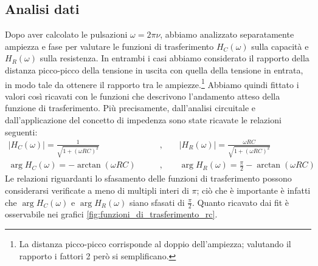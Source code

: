\documentclass[a4paper]{article}
\begin{document}
\subsection{Analisi dati}
Dopo aver calcolato le pulsazioni $\omega = 2\pi \nu$, abbiamo analizzato separatamente ampiezza e fase per valutare le funzioni di trasferimento $H_C(\omega)$ sulla capacità e $H_R(\omega)$ sulla resistenza. In entrambi i casi abbiamo considerato il rapporto della distanza picco-picco della tensione in uscita con quella della tensione in entrata, in modo tale da ottenere il rapporto tra le ampiezze.\footnote{La distanza picco-picco corrisponde al doppio dell'ampiezza; valutando il rapporto i fattori 2 però si semplificano.}
Abbiamo quindi fittato i valori così ricavati con le funzioni che descrivono l'andamento atteso della funzione di trasferimento. Più precisamente, dall'analisi circuitale e dall'applicazione del concetto di impedenza sono state ricavate le relazioni seguenti:
\begin{align}
|H_C(\omega)| = \frac{1}{\sqrt{1 + (\omega RC)^2}} \qquad & \text{,}\qquad |H_R(\omega)| = \frac{\omega RC}{\sqrt{1 + (\omega RC)^2}} \label{eq:ampiezza RC} \\
\arg H_C(\omega) = -\arctan(\omega RC) \qquad & \text{,}\qquad \arg H_R(\omega) = \frac{\pi}{2}-\arctan(\omega RC) \label{eq: fase RC}
\end{align}
Le relazioni riguardanti lo sfasamento delle funzioni di trasferimento possono considerarsi verificate a meno di multipli interi di $\pi$; ciò che è importante è infatti che $\arg H_C(\omega)$ e $\arg H_R(\omega)$ siano sfasati di $\frac{\pi}{2}$.
Quanto ricavato dai fit è osservabile nei grafici \ref{fig:funzioni_di_trasferimento_rc}.
\end{document}
